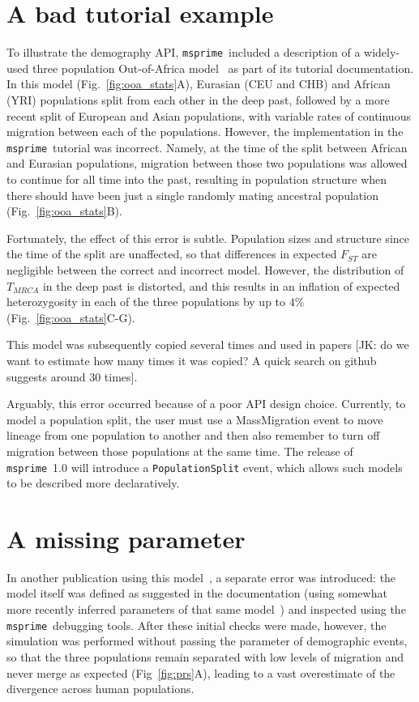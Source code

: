 \documentclass{article}
\newcommand{\msprime}[0]{\texttt{msprime}}
\begin{document}
\section{A bad tutorial example}

To illustrate the demography API, \msprime\ included a description of a widely-used
three population Out-of-Africa model~\citep{gutenkunst2009inferring}
as part of its tutorial documentation. In this model (Fig.~\ref{fig:ooa_stats}A),
Eurasian (CEU and CHB) and African (YRI) populations split from each other in the deep past, 
followed by a more recent split of European and Asian populations, with variable rates of 
continuous migration between each of the populations. However, the implementation in the 
\msprime\ tutorial was incorrect. Namely, at the time of the split between African and Eurasian
populations, migration between those two populations was allowed to continue for all time into the
past, resulting in population structure when there should have been just a single 
randomly mating ancestral population (Fig.~\ref{fig:ooa_stats}B).

Fortunately, the effect of this error is subtle. Population sizes and structure since the time of 
the split are unaffected, so that differences in expected $F_{ST}$ are negligible between 
the correct and incorrect model. However, the distribution of $T_{MRCA}$ in the deep past
is distorted, and this results in an inflation of expected heterozygosity in each of the three
populations by up to $4\%$ (Fig.~\ref{fig:ooa_stats}C-G).

This model was subsequently copied
several times and used in papers [JK: do we want to estimate how
many times it was copied? A quick search on github suggests around 30
times].

Arguably, this error occurred because of a poor API design choice.
Currently, to model a population split, the user must use a MassMigration event to move 
lineage from one population to another and then also remember to turn off migration
between those populations at the same time.
The release of \msprime\ 1.0 will introduce a \texttt{PopulationSplit} event, which allows
such models to be described more declaratively.

\section{A missing parameter}

In another publication using this model~\citep{martin2017human}, 
a separate error was introduced: the model itself was defined as suggested 
in the documentation (using somewhat more recently inferred parameters of that same
model~\citep{gravel2011demographic}) and inspected using the \msprime\ 
debugging tools. After these initial checks were made, however, the simulation 
was performed without passing the parameter of demographic events,
so that the three populations remain separated with low levels of migration and
never merge as expected (Fig~\ref{fig:prs}A),
leading to a vast overestimate of the divergence across human populations. 
\end{document}
